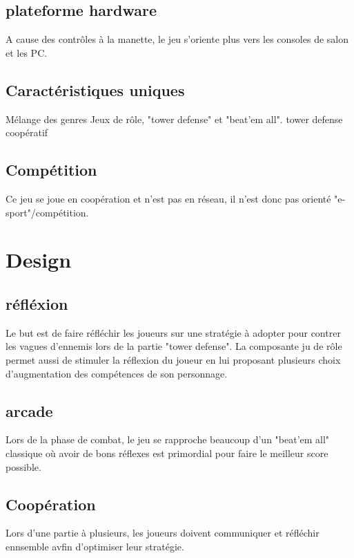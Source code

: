 \documentclass[12pt]{article}
\begin{document}
\subsection{plateforme hardware}
A cause des contrôles à la manette, le jeu s'oriente plus vers les consoles de salon et les PC.
\subsection{Caractéristiques uniques}
Mélange des genres Jeux de rôle, "tower defense" et "beat'em all".
tower defense coopératif
\subsection{Compétition}
Ce jeu se joue en coopération et n'est pas en réseau, il n'est donc pas orienté "e-sport"/compétition.


\section{Design}
\subsection{réfléxion}
Le but est de faire réfléchir les joueurs sur une stratégie à adopter pour contrer les vagues d'ennemis lors de la partie "tower defense". La composante ju de rôle permet aussi de stimuler la réflexion du joueur en lui proposant plusieurs choix d'augmentation des compétences de son personnage.
\subsection{arcade}
Lors de la phase de combat, le jeu se rapproche beaucoup d'un "beat'em all" classique où avoir de bons réflexes est primordial pour faire le meilleur score possible.
\subsection{Coopération}
Lors d'une partie à plusieurs, les joueurs doivent communiquer et réfléchir ennsemble avfin d'optimiser leur stratégie.
	
\end{document}
